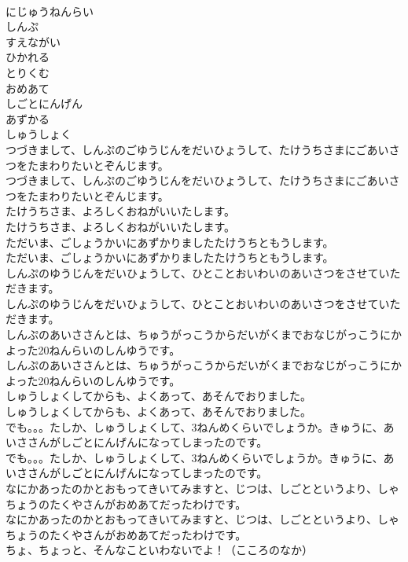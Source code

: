 \documentclass[8pt]{extreport}
\begin{document}
\begin{CJK}{UTF8}{min}
\\	にじゅうねんらい
\\	しんぷ
\\	すえながい
\\	ひかれる
\\	とりくむ
\\	おめあて
\\	しごとにんげん
\\	あずかる
\\	しゅうしょく
\\	つづきまして、しんぷのごゆうじんをだいひょうして、たけうちさまにごあいさつをたまわりたいとぞんじます。
\\	つづきまして、しんぷのごゆうじんをだいひょうして、たけうちさまにごあいさつをたまわりたいとぞんじます。
\\	たけうちさま、よろしくおねがいいたします。
\\	たけうちさま、よろしくおねがいいたします。
\\	ただいま、ごしょうかいにあずかりましたたけうちともうします。
\\	ただいま、ごしょうかいにあずかりましたたけうちともうします。
\\	しんぷのゆうじんをだいひょうして、ひとことおいわいのあいさつをさせていただきます。
\\	しんぷのゆうじんをだいひょうして、ひとことおいわいのあいさつをさせていただきます。
\\	しんぷのあいささんとは、ちゅうがっこうからだいがくまでおなじがっこうにかよった20ねんらいのしんゆうです。
\\	しんぷのあいささんとは、ちゅうがっこうからだいがくまでおなじがっこうにかよった20ねんらいのしんゆうです。
\\	しゅうしょくしてからも、よくあって、あそんでおりました。
\\	しゅうしょくしてからも、よくあって、あそんでおりました。
\\	でも。。。たしか、しゅうしょくして、3ねんめくらいでしょうか。きゅうに、あいささんがしごとにんげんになってしまったのです。
\\	でも。。。たしか、しゅうしょくして、3ねんめくらいでしょうか。きゅうに、あいささんがしごとにんげんになってしまったのです。
\\	なにかあったのかとおもってきいてみますと、じつは、しごとというより、しゃちょうのたくやさんがおめあてだったわけです。
\\	なにかあったのかとおもってきいてみますと、じつは、しごとというより、しゃちょうのたくやさんがおめあてだったわけです。
\\	ちょ、ちょっと、そんなこといわないでよ！（こころのなか）

\end{CJK}
\end{document}
